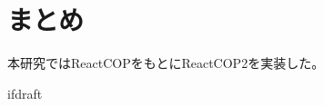 \documentclass{jsarticle}
\begin{document}
\fi
\section{まとめ}
本研究ではReactCOPをもとにReactCOP2を実装した。



\expandafter\ifx\csname ifdraft\endcsname\relax
\end{document}
